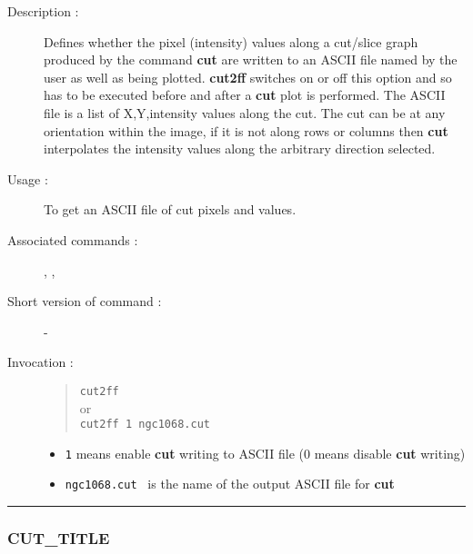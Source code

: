 \begin{description}

\item[Description :] Defines whether the pixel (intensity) values along
a cut/slice graph produced by the command {\bf cut} are written to an ASCII
file named by the user as well as being plotted.  {\bf cut2ff} switches on or
off this option and so has to be executed before and after a {\bf cut} plot
is performed.  The ASCII file is a list of X,Y,intensity values along
the cut.  The cut can be at any orientation within the image, if it is
not along rows or columns then {\bf cut} interpolates the intensity values
along the arbitrary direction selected.

\item[Usage :] To get an ASCII file of cut pixels and values.
\item[Associated commands :] {\tt {}},
{\tt {}}, {\tt {}}
\item[Short version of command :] -
\item[Invocation :]

\begin{quote}{\tt  cut2ff }\\
or \\
{\tt cut2ff 1 ngc1068.cut }
\end{quote}

\begin{itemize}

\item {\tt 1} means enable {\bf cut} writing to ASCII file
(0 means disable {\bf cut} writing)
\item {\tt ngc1068.cut } is the name of the output ASCII file for {\bf cut}
\end{itemize}

\end{description}

\hrule 
\subsubsection*{\label{CUT_TITLE}CUT\_TITLE}

